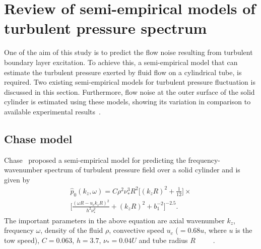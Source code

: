 \documentclass[twocolumn,10pt]{asme2ej}
\begin{document}
\section{Review of semi-empirical models of turbulent pressure spectrum} \label{sec:empmodels}
One of the aim of this study is to predict the flow noise resulting from turbulent boundary layer excitation. To achieve this, a semi-empirical model that can estimate the turbulent pressure exerted by fluid flow on a cylindrical tube, is required. Two existing semi-empirical models for turbulent pressure fluctuation is discussed in this section. Furthermore, flow noise at the outer surface of the solid cylinder is estimated using these models, showing its variation in comparison to available experimental results~\cite{Unni2011}. 

\subsection{Chase model}\label{Chase model}
Chase~\cite{Chase1981} proposed a semi-empirical model for predicting the frequency-wavenumber spectrum of turbulent pressure field over a solid cylinder and is given by
\begin{multline}\label{Turbulent pressure spectrum equation Chase}
        \hat{p}_{0}(k_{z},\omega) = C\rho^{2}\nu_{*}^{3}R^2\biggl[(k_{z}R)^{2}+\frac{1}{12}\biggr]\times \\ \biggl[\frac{(\omega R-u_{c}k_{z}R)^{2}}{h^{2}\nu_{*}^{2}}+(k_{z}R)^{2}+b_1^{-2}\biggr]^{-2.5}.
\end{multline}
The important parameters in the above equation are axial wavenumber $k_{z}$, frequency $\omega$, density of the fluid $\rho$, convective speed $u_{c}$ ($=0.68u$, where $u$ is the tow speed), $C=0.063$, $h=3.7$, $\nu_{*}=0.04U$ and tube radius $R$~\cite{Chase1981}~\cite{carpenter1983}~\cite{knight1996}~\cite{KUTTANCHANDRIKA2014}~\cite{Huang2020}.
\end{document}
